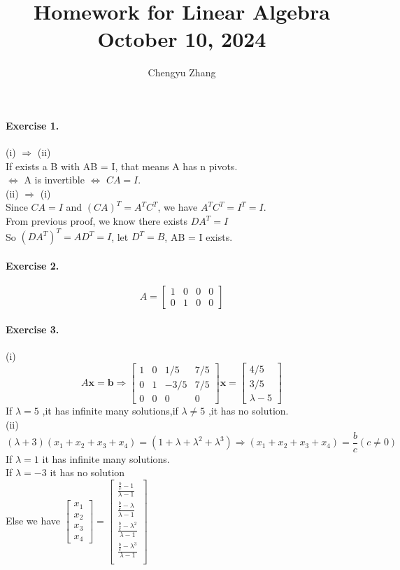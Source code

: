 \documentclass{article}
\title{\vspace*{-3.5cm}Homework for Linear Algebra \\October 10, 2024}
\author{Chengyu Zhang}
\date{}
\begin{document}
\maketitle

\paragraph{Exercise 1.}
(i) $\Rightarrow$ (ii) \\
If exists a B with AB = I, that means A has n pivots.\\
$\Leftrightarrow$ A is invertible $\Leftrightarrow$  $CA=I$.\\
(ii) $\Rightarrow$ (i) \\
Since $CA = I$ and $(CA)^T=A^TC^T$, we have $A^TC^T=I^T=I$.\\
From previous proof, we know there exists $DA^T=I$\\
So $(DA^T)^T=AD^T=I$, let $D^T=B$, AB = I exists.

\paragraph{Exercise 2.}
\[
A=\begin{bmatrix}
    1 & 0 & 0 & 0\\
    0 & 1 & 0 & 0
\end{bmatrix}
\]

\paragraph{Exercise 3.}
(i)\[
A\mathbf{x}=\mathbf{b} \Rightarrow \begin{bmatrix}
    1 & 0 & 1/5 & 7/5\\
    0 & 1 & -3/5 & 7/5\\
    0 & 0 & 0 & 0
\end{bmatrix}\mathbf{x}=\begin{bmatrix}
    4/5\\3/5\\ \lambda-5
\end{bmatrix}
\]
If $\lambda = 5$ ,it has infinite many solutions,if $\lambda \neq 5$ ,it has no solution.\\
(ii)\[
(\lambda + 3)(x_1+x_2+x_3+x_4)= (1 + \lambda + \lambda^2 + \lambda^3) \Rightarrow (x_1+x_2+x_3+x_4)=\frac{b}{c} (c \neq 0)
\]
If  $\lambda = 1$ it has infinite many solutions.\\
If $\lambda = -3$ it has no solution\\
Else we have $\begin{bmatrix}
    x_1\\x_2\\x_3\\x_4
\end{bmatrix}=\begin{bmatrix}
    \frac{\frac{b}{c}-1}{\lambda - 1}\\
    \frac{\frac{b}{c}-\lambda}{\lambda - 1}\\
    \frac{\frac{b}{c}-\lambda^2}{\lambda - 1}\\
    \frac{\frac{b}{c}-\lambda^3}{\lambda - 1}\\
\end{bmatrix}$
\end{document}
